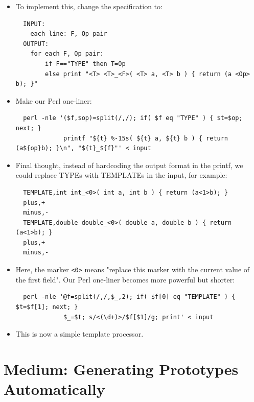 \documentclass[aspectratio=169]{beamer}
\newcommand{\pitem}{\pause \item}
\begin{document}
\begin{frame}[fragile]
    \begin{itemize}
\item
To implement this, change the specification to:

\tiny
\begin{verbatim}
  INPUT:
    each line: F, Op pair
  OUTPUT:
    for each F, Op pair:
        if F=="TYPE" then T=Op
        else print "<T> <T>_<F>( <T> a, <T> b ) { return (a <Op> b); }"
\end{verbatim}
\small

\item
Make our Perl one-liner:

\tiny
\begin{verbatim}
  perl -nle '($f,$op)=split(/,/); if( $f eq "TYPE" ) { $t=$op; next; }
             printf "${t} %-15s( ${t} a, ${t} b ) { return (a${op}b); }\n", "${t}_${f}"' < input
\end{verbatim}
\small


\pitem
Final thought, instead of hardcoding the output format in the printf,
we could replace TYPEs with TEMPLATEs in the input, for example:

\tiny
\begin{verbatim}
  TEMPLATE,int int_<0>( int a, int b ) { return (a<1>b); }
  plus,+
  minus,-
  TEMPLATE,double double_<0>( double a, double b ) { return (a<1>b); }
  plus,+
  minus,-
\end{verbatim}
\small

\item
Here, the marker \verb+<0>+ means
"replace this marker with the current value of the first field".
Our Perl one-liner becomes more powerful but shorter:

\tiny
\begin{verbatim}
  perl -nle '@f=split(/,/,$_,2); if( $f[0] eq "TEMPLATE" ) { $t=$f[1]; next; }
             $_=$t; s/<(\d+)>/$f[$1]/g; print' < input
\end{verbatim}
\small

\item
This is now a simple template processor.

    \end{itemize}
\end{frame}

\section{Medium: Generating Prototypes Automatically}
\end{document}
